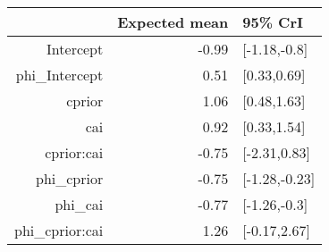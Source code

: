 \begin{tabular}{rrl}
  \hline
 & Expected mean & 95\% CrI \\ 
  \hline
Intercept & -0.99 & [-1.18,-0.8] \\ 
  phi\_Intercept & 0.51 & [0.33,0.69] \\ 
  cprior & 1.06 & [0.48,1.63] \\ 
  cai & 0.92 & [0.33,1.54] \\ 
  cprior:cai & -0.75 & [-2.31,0.83] \\ 
  phi\_cprior & -0.75 & [-1.28,-0.23] \\ 
  phi\_cai & -0.77 & [-1.26,-0.3] \\ 
  phi\_cprior:cai & 1.26 & [-0.17,2.67] \\ 
   \hline
\end{tabular}

